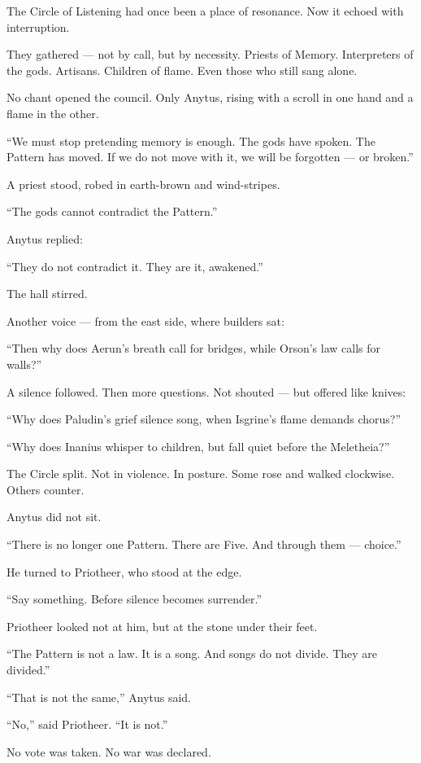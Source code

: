 \documentclass[9pt]{article}
\begin{document}
The Circle of Listening had once been a place of resonance.  
Now it echoed with interruption.

They gathered — not by call, but by necessity.  
Priests of Memory.  
Interpreters of the gods.  
Artisans. Children of flame.  
Even those who still sang alone.

No chant opened the council.  
Only Anytus, rising with a scroll in one hand and a flame in the other.

 “We must stop pretending memory is enough.  
 The gods have spoken.  
 The Pattern has moved.  
 If we do not move with it, we will be forgotten — or broken.”

A priest stood, robed in earth-brown and wind-stripes.

 “The gods cannot contradict the Pattern.”

Anytus replied:

 “They do not contradict it. They are it, awakened.”

The hall stirred.

Another voice — from the east side, where builders sat:

 “Then why does Aerun’s breath call for bridges,  
 while Orson’s law calls for walls?”

A silence followed.  
Then more questions.  
Not shouted — but offered like knives:

 “Why does Paludin’s grief silence song,  
 when Isgrine’s flame demands chorus?”

 “Why does Inanius whisper to children,  
 but fall quiet before the Meletheia?”

The Circle split.  
Not in violence.  
In posture.  
Some rose and walked clockwise.  
Others counter.

Anytus did not sit.

 “There is no longer one Pattern.  
 There are Five.  
 And through them — choice.”

He turned to Priotheer, who stood at the edge.

 “Say something. Before silence becomes surrender.”

Priotheer looked not at him,  
but at the stone under their feet.

 “The Pattern is not a law.  
 It is a song.  
 And songs do not divide.  
 They are divided.”

 “That is not the same,” Anytus said.

 “No,” said Priotheer. “It is not.”

No vote was taken.  
No war was declared.
\end{document}
